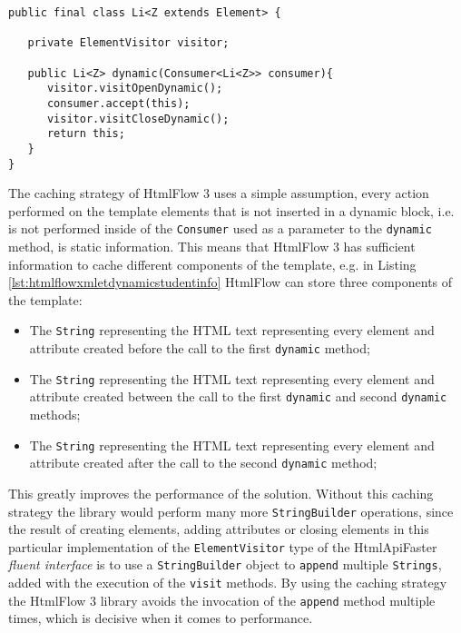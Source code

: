 \begin{minipage}{\linewidth}
\begin{lstlisting}[caption={Li Class - The dynamic method},label={lst:dynamicmethod}]
public final class Li<Z extends Element> {

   private ElementVisitor visitor;

   public Li<Z> dynamic(Consumer<Li<Z>> consumer){
      visitor.visitOpenDynamic();
      consumer.accept(this);
      visitor.visitCloseDynamic();
      return this;
   }   
}
\end{lstlisting}
\end{minipage}

\noindent
The caching strategy of HtmlFlow 3 uses a simple assumption, every action performed on the template elements that is not inserted in a dynamic block, i.e. is not performed inside of the \texttt{Consumer} used as a parameter to the \texttt{dynamic} method, is static information. This means that HtmlFlow 3 has sufficient information to cache different components of the template, e.g. in Listing \ref{lst:htmlflowxmletdynamicstudentinfo} HtmlFlow can store three components of the template: 

\begin{itemize}
	\item The \texttt{String} representing the \ac{HTML} text representing every element and attribute created before the call to the first \texttt{dynamic} method;
	\item The \texttt{String} representing the \ac{HTML} text representing every element and attribute created between the call to the first \texttt{dynamic} and second \texttt{dynamic} methods;
	\item The \texttt{String} representing the \ac{HTML} text representing every element and attribute created after the call to the second \texttt{dynamic} method;
\end{itemize}

\noindent
This greatly improves the performance of the solution. Without this caching strategy the library would perform many more \texttt{StringBuilder} operations, since the result of creating elements, adding attributes or closing elements in this particular implementation of the \texttt{ElementVisitor} type of the HtmlApiFaster \textit{fluent interface} is to use a \texttt{StringBuilder} object to \texttt{append} multiple \texttt{Strings}, added with the execution of the \texttt{visit} methods. By using the caching strategy the HtmlFlow 3 library avoids the invocation of the \texttt{append} method multiple times, which is decisive when it comes to performance.

